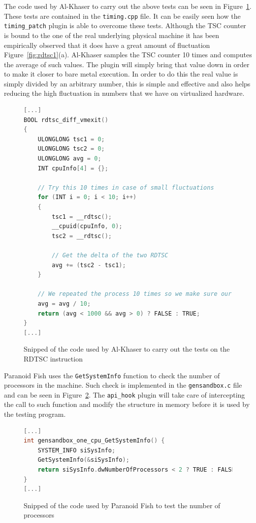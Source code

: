 The code used by Al-Khaser to carry out the above tests can be seen in Figure~\ref{fig:altest}. These tests are contained in the \lstinline{timing.cpp} file. It can be easily seen how the \lstinline{timing_patch} plugin is able to overcome these tests. Although the TSC counter is bound to the one of the real underlying physical machine it has been empirically observed that it does have a great amount of fluctuation Figure~\ref{fig:rdtsc1}(a). Al-Khaser samples the TSC counter 10 times and computes the average of such values. The plugin will simply bring that value down in order to make it closer to bare metal execution. In order to do this the real value is simply divided by an arbitrary number, this is simple and effective and also helps reducing the high fluctuation in numbers that we have on virtualized hardware.  

\begin{figure}[htp]
\centering
\begin{lstlisting}[language=C]
[...]
BOOL rdtsc_diff_vmexit()
{
	ULONGLONG tsc1 = 0;
	ULONGLONG tsc2 = 0;
	ULONGLONG avg = 0;
	INT cpuInfo[4] = {};

	// Try this 10 times in case of small fluctuations
	for (INT i = 0; i < 10; i++)
	{
		tsc1 = __rdtsc();
		__cpuid(cpuInfo, 0);
		tsc2 = __rdtsc();

		// Get the delta of the two RDTSC
		avg += (tsc2 - tsc1);
	}

	// We repeated the process 10 times so we make sure our check is as much reliable as we can
	avg = avg / 10;
	return (avg < 1000 && avg > 0) ? FALSE : TRUE;
}
[...]
\end{lstlisting}
\caption{Snipped of the code used by Al-Khaser to carry out the tests on the RDTSC instruction}
\label{fig:altest}
\end{figure}

Paranoid Fish uses the \lstinline{GetSystemInfo} function to check the number of processors in the machine. Such check is implemented in the \lstinline{gensandbox.c} file and can be seen in Figure~\ref{fig:patest}. The \lstinline{api_hook} plugin will take care of intercepting the call to such function and modify the structure in memory before it is used by the testing program. 

\begin{figure}[htp]
\centering
\begin{lstlisting}[language=C]
[...]
int gensandbox_one_cpu_GetSystemInfo() {
	SYSTEM_INFO siSysInfo;
	GetSystemInfo(&siSysInfo);
	return siSysInfo.dwNumberOfProcessors < 2 ? TRUE : FALSE;
}
[...]
\end{lstlisting}
\caption{Snipped of the code used by Paranoid Fish to test the number of processors}
\label{fig:patest}
\end{figure}

